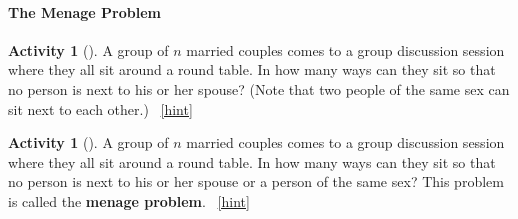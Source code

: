 \documentclass[10pt,]{book}
\newcommand{\terminology}[1]{\textbf{#1}}
\theoremstyle{plain}
\theoremstyle{definition}
\theoremstyle{definition}
\theoremstyle{definition}
\newtheorem{activity}[project]{Activity}
\numberwithin{equation}{chapter}
\begin{document}
\paragraph[{The Menage Problem}]{The Menage Problem}\hypertarget{sec-menage}{}
\begin{activity}[]\label{relaxedmenage}
\hypertarget{p-792}{}%
A group of \(n\) married couples comes to a group discussion session where they all sit around a round table. In how many ways can they sit so that no person is next to his or her spouse? (Note that two people of the same sex can sit next to each other.)%
~\hfill{\tiny\hyperlink{a-164}{[hint]}\hypertarget{q-164}{}}\end{activity}
\begin{activity}[]\label{activity-165}
\hypertarget{p-796}{}%
A group of \(n\) married couples comes to a group discussion session where they all sit around a round table. In how many ways can they sit so that no person is next to his or her spouse or a person of the same sex? This problem is called the \terminology{menage problem}.%
~\hfill{\tiny\hyperlink{a-165}{[hint]}\hypertarget{q-165}{}}\end{activity}
\typeout{************************************************}
\typeout{************************************************}
\end{document}
